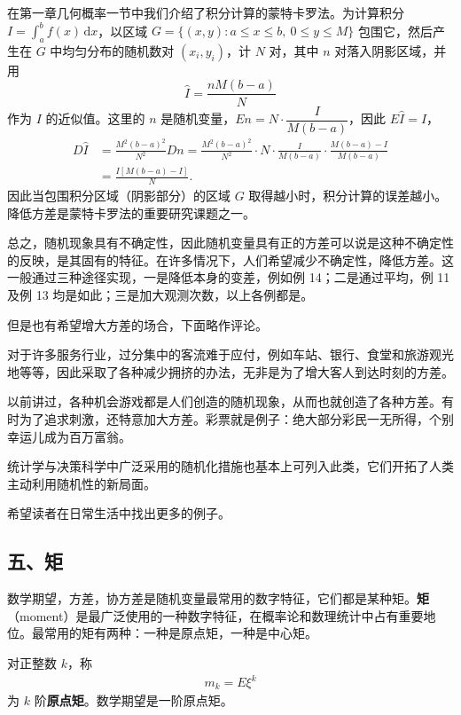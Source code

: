 \documentclass[../../main.tex]{subfiles}
\begin{document}
\begin{example}[蒙特卡罗法的方差]\label{example:ch04-蒙特卡罗方差}
在第一章几何概率一节中我们介绍了积分计算的蒙特卡罗法。为计算积分 $I=\int_a^b f(x)\,\mathrm{d}x$，以区域 $G=\{(x,y):a\leqslant x\leqslant b,\ 0\leqslant y\leqslant M\}$ 包围它，然后产生在 $G$ 中均匀分布的随机数对 $(x_i,y_i)$，计 $N$ 对，其中 $n$ 对落入阴影区域，并用
\[
\hat{I}=\frac{nM(b-a)}{N}
\]
作为 $I$ 的近似值。这里的 $n$ 是随机变量，$En=N\cdot\dfrac{I}{M(b-a)}$，因此 $E\hat{I}=I$，
\begin{align}
D\hat{I}&=\frac{M^2(b-a)^2}{N^2}Dn
=\frac{M^2(b-a)^2}{N^2}\cdot N\cdot\frac{I}{M(b-a)}\cdot\frac{M(b-a)-I}{M(b-a)}\nonumber\\
&=\frac{I[M(b-a)-I]}{N}.\label{align:ch04-蒙特卡罗方差}
\end{align}
因此当包围积分区域（阴影部分）的区域 $G$ 取得越小时，积分计算的误差越小。降低方差是蒙特卡罗法的重要研究课题之一。

总之，随机现象具有不确定性，因此随机变量具有正的方差可以说是这种不确定性的反映，是其固有的特征。在许多情况下，人们希望减少不确定性，降低方差。这一般通过三种途径实现，一是降低本身的变差，例如例 14；二是通过平均，例 11 及例 13 均是如此；三是加大观测次数，以上各例都是。

但是也有希望增大方差的场合，下面略作评论。

对于许多服务行业，过分集中的客流难于应付，例如车站、银行、食堂和旅游观光地等等，因此采取了各种减少拥挤的办法，无非是为了增大客人到达时刻的方差。

以前讲过，各种机会游戏都是人们创造的随机现象，从而也就创造了各种方差。有时为了追求刺激，还特意加大方差。彩票就是例子：绝大部分彩民一无所得，个别幸运儿成为百万富翁。

统计学与决策科学中广泛采用的随机化措施也基本上可列入此类，它们开拓了人类主动利用随机性的新局面。

希望读者在日常生活中找出更多的例子。
\end{example}

\subsection*{五、矩}

数学期望，方差，协方差是随机变量最常用的数字特征，它们都是某种矩。\textbf{矩}（moment）是最广泛使用的一种数字特征，在概率论和数理统计中占有重要地位。最常用的矩有两种：一种是原点矩，一种是中心矩。

\begin{definition}[原点矩]\label{definition:ch04-原点矩}
对正整数 $k$，称
\begin{align}
m_k=E\xi^k\label{align:ch04-原点矩}
\end{align}
为 $k$ 阶\textbf{原点矩}。数学期望是一阶原点矩。
\end{definition}
\end{document}
